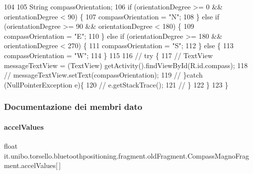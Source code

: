 \begin{DoxyCode}
104 
105             String compassOrientation;
106             \textcolor{keywordflow}{if} (orientationDegree >= 0 && orientationDegree < 90) \{
107                 compassOrientation = \textcolor{stringliteral}{"N"};
108             \} \textcolor{keywordflow}{else} \textcolor{keywordflow}{if} (orientationDegree >= 90 && orientationDegree < 180) \{
109                 compassOrientation = \textcolor{stringliteral}{"E"};
110             \} \textcolor{keywordflow}{else} \textcolor{keywordflow}{if} (orientationDegree >= 180 && orientationDegree < 270) \{
111                 compassOrientation = \textcolor{stringliteral}{"S"};
112             \} \textcolor{keywordflow}{else} \{
113                 compassOrientation = \textcolor{stringliteral}{"W"};
114             \}
115 
116 \textcolor{comment}{//            try \{}
117 \textcolor{comment}{//                TextView messageTextView = (TextView) getActivity().findViewById(R.id.compass);}
118 \textcolor{comment}{//                messageTextView.setText(compassOrientation);}
119 \textcolor{comment}{//            \}catch (NullPointerException e)\{}
120 \textcolor{comment}{//                e.getStackTrace();}
121 \textcolor{comment}{//            \}}
122         \}
123     \}
\end{DoxyCode}


\subsubsection{Documentazione dei membri dato}
\hypertarget{classit_1_1unibo_1_1torsello_1_1bluetoothpositioning_1_1fragment_1_1oldFragment_1_1CompassMagnoFragment_a6fd163a92ff4354d07d7eefbeed24b62_a6fd163a92ff4354d07d7eefbeed24b62}{}\label{classit_1_1unibo_1_1torsello_1_1bluetoothpositioning_1_1fragment_1_1oldFragment_1_1CompassMagnoFragment_a6fd163a92ff4354d07d7eefbeed24b62_a6fd163a92ff4354d07d7eefbeed24b62} 
\paragraph{\texorpdfstring{accel\+Values}{accelValues}}
{\footnotesize\ttfamily float it.\+unibo.\+torsello.\+bluetoothpositioning.\+fragment.\+old\+Fragment.\+Compass\+Magno\+Fragment.\+accel\+Values\mbox{[}$\,$\mbox{]}\hspace{0.3cm}{\ttfamily [private]}}

